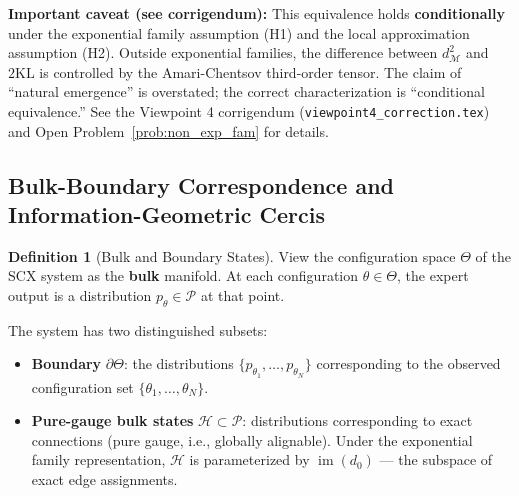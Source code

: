 \documentclass[12pt,a4paper]{article}
\theoremstyle{definition}
\newtheorem{definition}{Definition}[section]
\theoremstyle{remark}
\theoremstyle{definition}
\newcommand{\KL}{\mathrm{KL}}
\newcommand{\GeoDist}{d_{\mathcal{M}}}
\DeclareMathOperator{\im}{im}
\begin{document}
\textbf{Important caveat (see corrigendum):} This equivalence holds \textbf{conditionally} under the exponential family assumption (H1) and the local approximation assumption (H2). Outside exponential families, the difference between $\GeoDist^2$ and $2\KL$ is controlled by the Amari-Chentsov third-order tensor. The claim of ``natural emergence'' is overstated; the correct characterization is ``conditional equivalence.'' See the Viewpoint 4 corrigendum (\texttt{viewpoint4\_correction.tex}) and Open Problem~\ref{prob:non_exp_fam} for details.

\subsection{Bulk-Boundary Correspondence and Information-Geometric Cercis}

\begin{definition}[Bulk and Boundary States]\label{def:bulk_boundary}
View the configuration space $\Theta$ of the SCX system as the \textbf{bulk} manifold.
At each configuration $\theta \in \Theta$, the expert output is a distribution $p_\theta \in \mathcal{P}$ at that point.

The system has two distinguished subsets:
\begin{itemize}
    \item \textbf{Boundary} $\partial \Theta$: the distributions $\{p_{\theta_1}, \dots, p_{\theta_N}\}$ corresponding to the observed configuration set $\{\theta_1, \dots, \theta_N\}$.
    \item \textbf{Pure-gauge bulk states} $\mathcal{H} \subset \mathcal{P}$:
    distributions corresponding to exact connections (pure gauge, i.e., globally alignable).
    Under the exponential family representation, $\mathcal{H}$ is parameterized by $\im(d_0)$ — the subspace of exact edge assignments.
\end{itemize}
\end{definition}
\end{document}
